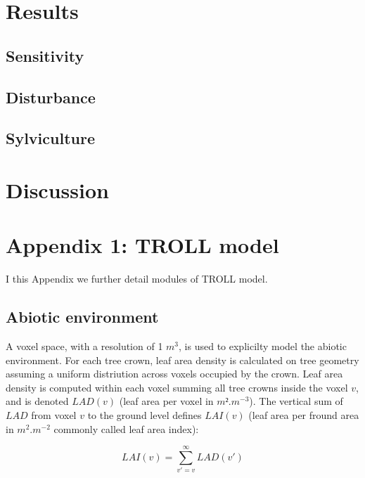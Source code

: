 \documentclass[12pt,]{article}
\let\oldsection\section
\renewcommand\section{\newpage\oldsection}
\theoremstyle{definition}
\theoremstyle{definition}
\theoremstyle{remark}
\begin{document}
\section{Results}\label{results}

\subsection{Sensitivity}\label{sensitivity}

\subsection{Disturbance}\label{disturbance-1}

\subsection{Sylviculture}\label{sylviculture-1}

\section{Discussion}\label{discussion}

\appendix


\hypertarget{appendix-1-troll-model}{\section{Appendix 1: TROLL
model}\label{appendix-1-troll-model}}

I this Appendix we further detail modules of TROLL model.

\subsection{Abiotic environment}\label{abiotic-environment}

A voxel space, with a resolution of 1 \(m^3\), is used to explicilty
model the abiotic environment. For each tree crown, leaf area density is
calculated on tree geometry assuming a uniform distriution across voxels
occupied by the crown. Leaf area density is computed within each voxel
summing all tree crowns inside the voxel \(v\), and is denoted
\(LAD(v)\) (leaf area per voxel in \(m².m^{-3}\)). The vertical sum of
\(LAD\) from voxel \(v\) to the ground level defines \(LAI(v)\) (leaf
area per fround area in \(m^2.m^{-2}\) commonly called leaf area index):

\begin{equation}
  LAI(v) = \sum _{v'=v} ^\infty LAD(v') 
  \label{eq:LAI}
\end{equation}
\end{document}
